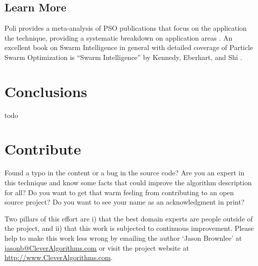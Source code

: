 \documentclass[a4paper, 11pt]{article}
\makeatletter
\newcommand{\myreportauthor}{Jason Brownlee}
\newcommand{\myreportemail}{jasonb@CleverAlgorithms.com}
\newcommand{\myreportwebsite}{http://www.CleverAlgorithms.com}
\makeatother
\begin{document}
% 
% 
\subsection{Learn More}

Poli provides a meta-analysis of PSO publications that focus on the application the technique, providing a systematic breakdown on application areas \cite{Poli2008a}. 
An excellent book on Swarm Intelligence in general with detailed coverage of Particle Swarm Optimization is ``Swarm Intelligence'' by Kennedy, Eberhart, and Shi \cite{Kennedy2001}.

% 
% 
\section{Conclusions}
\label{sec:conclusions}
todo

% 
% 
\section{Contribute}
\label{sec:contribute}
Found a typo in the content or a bug in the source code? 
Are you an expert in this technique and know some facts that could improve the algorithm description for all?
Do you want to get that warm feeling from contributing to an open source project? 
Do you want to see your name as an acknowledgment in print?

Two pillars of this effort are i) that the best domain experts are people outside of the project, and ii) that this work is subjected to continuous improvement. 
Please help to make this work less wrong by emailing the author `\myreportauthor' at \url{\myreportemail} or visit the project website at \url{\myreportwebsite}.



\end{document}
